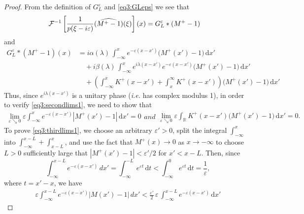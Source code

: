 \documentclass[../dissertation.tex]{subfiles}
\begin{document}
\begin{proof}
	From the definition of $G_L^\varepsilon$ and \eqref{eq3:GLeps} we see that
	\begin{align*}
		\mathcal F^{-1}
				\left[ 
					\frac{1}{p(\xi-i\varepsilon)} (\widehat{M^+-1})(\xi) 
				\right](x) 
			&= G_L^\varepsilon * (M^+-1)
	\end{align*}
	and
	\begin{align*}
		G_L^\varepsilon * (M^+-1)(x)
			&= i \alpha(\lambda) \, 
				\int_{-\infty}^x 
					e^{-\varepsilon(x - x')} \big(M^+(x')-1\big) 
				\, \mathrm{d}x' \\
			&\quad + i \beta(\lambda) \, 
					\int_{-\infty}^x 
						e^{i\lambda (x-x')} e^{-\varepsilon(x-x')}\big(M^+(x')-1\big) 
					\, \mathrm{d}x' \\
			&\quad + \left( 
						\int_{-\infty}^x K^+(x- x') + \int_{x}^\infty K^+(x - x') 
					\right)
					\big(M^+(x')-1\big) \, \mathrm{d}x'
	\end{align*}
	Thus, since $e^{i\lambda (x-x')}$ is a unitary phase (\textit{i.e.} has complex 
	modulus 1), in order to verify \eqref{eq3:secondlims1}, we need to show that
	\begin{subequations}
		\label{eq3:thirdlims}
		\begin{align}
			\label{eq3:thirdlims1}
			\lim_{\varepsilon\searrow 0} \varepsilon 
				\int_{-\infty}^x 
					e^{-\varepsilon(x-x')} |M^+(x') - 1| 
				\, \mathrm{d}x' = 0
		\end{align}
		and
		\begin{align}
			\label{eq3:thirdlims2}
			\lim_{\varepsilon\searrow 0} \varepsilon 
					\int_{\mathbb R} K^+(x- x') \big(M^+(x')-1\big) \, \mathrm{d}x'
				= 0.
		\end{align}
	\end{subequations}
	To prove \eqref{eq3:thirdlims1}, we choose an arbitrary $\varepsilon'>0$, 
	split the integral $\int_{-\infty}^x$ into $\int_{-\infty}^{x-L} + \int_{x-L}^x$, 
	and use the fact that $M^+(x) \to 0$ as $x \to -\infty$ to choose $L>0$ 
	sufficiently large that $|M^+(x')  - 1| < \varepsilon'/2$ for $x' < x-L$. Then,
	since 
	\[
		\int_{-\infty}^{x-L} e^{-\varepsilon (x-x')} \,dx'
			= \int_{-\infty}^{-L} e^{\varepsilon t} \, \mathrm{d}t
			< \int_{-\infty}^0 e^{\varepsilon t} \, \mathrm{d}t 
			= \frac{1}{\varepsilon},
	\]
	where $t = x'-x$, we have
	\begin{align} \label{eq3:DEtoIEthirdlim1v1}
		\varepsilon \int_{-\infty}^{x-L} e^{-\varepsilon(x-x')} |M(x') - 1| \,dx'
			< \frac{\varepsilon'}{2} \, \varepsilon \, \int_{-\infty}^{x-L} e^{-\varepsilon(x-x')} \, \mathrm{d}x'

\end{align}
\end{proof}
\end{document}
